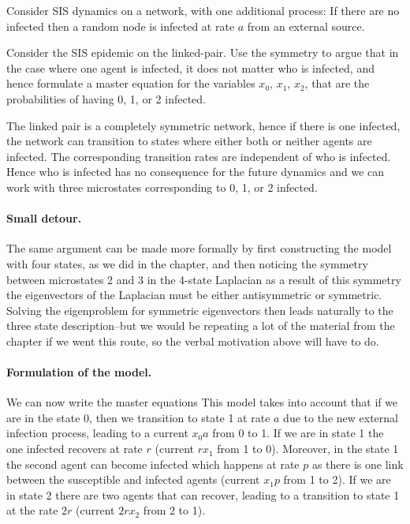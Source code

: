 Consider SIS dynamics on a network, with one additional process: If there are no infected then a random node is infected at rate $a$ from an external source.   

\subquestion 
Consider the SIS epidemic on the linked-pair. Use the symmetry to argue that in the case where one agent is infected, it does not matter who is infected, and hence formulate a master equation for the variables $x_0$, $x_1$, $x_2$, that are the probabilities of having 0, 1, or 2 infected. 

\solution 
The linked pair is a completely symmetric network, hence if there is one infected, the network can transition to states where either both or neither agents are infected. The corresponding transition rates are independent of who is infected. Hence who is infected has no consequence for the future dynamics and we can work with three microstates corresponding to  0, 1, or 2 infected. 

\paragraph{Small detour.} The same argument can be made more formally by first constructing the model with four states, as we did in the chapter, and then noticing the symmetry between microstates 2 and 3 in the 4-state Laplacian as a result of this symmetry the eigenvectors of the Laplacian must be either antisymmetric or symmetric. Solving the eigenproblem for symmetric eigenvectors then leads naturally to the three state description--but we would be repeating a lot of the material from the chapter if we went this route, so the verbal motivation above will have to do. 

\paragraph{Formulation of the model.} We can now write the master equations
This model takes into account that if we are in the state $0$, then we transition to state 1 at rate $a$ due to the new external infection process, leading to a current $x_0a$ from 0 to 1. If we are in state 1 the one infected recovers at rate $r$ (current $rx_1$ from 1 to 0). Moreover, in the state 1 the second agent can become infected which happens at rate $p$ as there is one link between the susceptible and infected agents (current $x_1p$ from 1 to 2). If we are in state 2 there are two agents that can recover, leading to a transition to state 1 at the rate $2r$ (current $2rx_2$ from 2 to 1).

